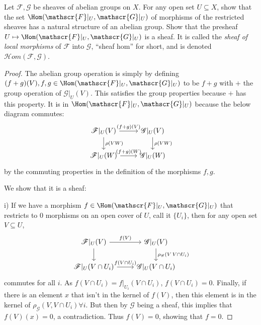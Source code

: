 \begin{exercise}%
	Let $\mathscr{F}, \mathscr{G} $ be sheaves of abelian groups on $X $. For any open set $U \subseteq X $, show that the set $\Hom(\mathscr{F}|_U, \mathscr{G}|_U) $ of morphisms of the restricted sheaves has a natural structure of an abelian group. Show that the presheaf $U\mapsto \Hom(\mathscr{F}|_U, \mathscr{G}|_U) $ is a sheaf. It is called the \textit{sheaf of local morphisms} of $\mathscr{F} $ into $\mathscr{G} $, ``sheaf hom'' for short, and is denoted $\mathscr{H}om(\mathscr{F},\mathscr{G}) $.
\end{exercise}
\begin{proof}
	The abelian group operation is simply by defining $(f+g)(V), f,g \in \Hom(\mathscr{F}|_U, \mathscr{G}|_U) $ to be $f+g $ with $+ $ the group operation of $\mathscr{G}|_U(V) $.
	This satisfies the group properties because $+ $ has this property.
	It is in $\Hom(\mathscr{F}|_U, \mathscr{G}|_U) $ because the below diagram commutes:
	\[
	\begin{tikzcd}
	\mathscr{F}|_U(V) & \mathscr{G}|_U(V)\\
	\mathscr{F}|_U(W) & \mathscr{G}|_U(W)
	\arrow["(f+g)(V)",from=1-1,to=1-2]
	\arrow["\rho(VW)",from=1-1,to=2-1]
	\arrow["(f+g)(W)",from=2-1,to=2-2]
	\arrow["\rho(VW)",from=1-2,to=2-2]
	\end{tikzcd}
	\]
	by the commuting properties in the definition of the morphisms $f,g $.

	We show that it is a sheaf:

	i) If we have a morphism $f \in \Hom(\mathscr{F}|_U, \mathscr{G}|_U) $ that restricts to 0 morphisms on an open cover of $U $, call it $\{U_i\}   $, then for any open set $V \subseteq U $,
	\[
	\begin{tikzcd}
		{\mathscr{F}|_U(V)} & {\mathscr{G}|_U(V)}\\
		{\mathscr{F}|_U(V\cap U_i)} & {\mathscr{G}|_U(V\cap U_i)}
	\arrow["f(V)",from=1-1,to=1-2]
	\arrow[from=1-1,to=2-1]
	\arrow["f(V\cap U_i)",from=2-1,to=2-2]
	\arrow["\rho_\mathscr{G}(V\,V\cap U_i)",from=1-2,to=2-2]
	\end{tikzcd}
	\]
	commutes for all $i $.
	As $f(V\cap U_i) = f|_{U_i}(V\cap U_i) $, $f(V\cap U_i) = 0 $.
	Finally, if there is an element $x $ that isn't in the kernel of $f(V) $, then this element is in the kernel of $\rho_{\mathscr{G}}(V,V\cap U_i) \forall i $.
	But then by $\mathscr{G} $ being a sheaf, this implies that $f(V)(x) = 0$, a contradiction.
	Thus $f(V) = 0 $, showing that $f = 0 $.


\end{proof}

